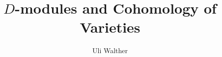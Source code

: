 \title{$D$-modules and Cohomology of Varieties}
\author{Uli Walther}

\maketitle

\newtheorem{alg}[theorem]{Algorithm}{\bfseries}{}

\def\ann{\operatorname{ann}}
\def\ass{\operatorname{ass}}
\def\codim{\operatorname{codim}}
\def\cd{\operatorname{cd}}
\def\depth{\operatorname{depth}}
\def\Der{\operatorname{Der}}
\def\endo{\operatorname{End}}
\def\ext{\operatorname{Ext}}
\def\gr{\operatorname{gr}}
\def\hom{\operatorname{Hom}}
\def\height{\operatorname{ht}}
\def\im{\operatorname{im}}
\def\ini{\operatorname{in}}
\def\lcd{\operatorname{lcd}}
\def\lcm{\operatorname{lcm}}
\def\spec{\operatorname{Spec}}
\def\soc{\operatorname{soc}}
\def\supp{\operatorname{supp}}
\def\var{\operatorname{Var}}

\def\curlN{{\mathcal N}}
\def\del{\partial}
\def\eps{\varepsilon}
\def\m{{\mathfrak m}}
\def\into{\hookrightarrow}
\def\onto{\to\hskip-1.7ex\to}
\def\A{{\mathbb A}}
\def\C{{\mathbb C}}
\def\F{{\mathfrak F}}
\def\M{{\mathcal M}}
\def\N{{\mathbb N}}
\def\OO{{\mathcal O}}
\def\P{{\mathbb P}}
\def\Q{{\mathbb Q}}
\def\R{{\mathbb R}}
\def\Z{{\mathbb Z}}


\def\action{\bullet}
\def\order{\prec}




\def\_#1{\underline{#1}}
\def\mylabel#1{\label{#1}}
\def\myindex#1{\index{#1}}
\def\h{\hspace*{-3pt}}
\def\bar#1{\overline{#1}}




